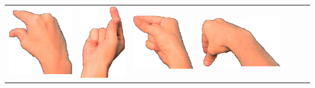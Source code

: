 \documentclass{article}
\begin{document}
\begin{center}
\begin{tabular}{r*{6}{c}}
\includegraphics[scale=0.1]{images/09-12-3.jpg}&
\includegraphics[scale=0.1]{images/09-12-4.jpg}&
\includegraphics[scale=0.1]{images/09-12-5.jpg}&
\includegraphics[scale=0.1]{images/09-12-6.jpg}\\

\end{tabular}
\end{center}
\end{document}
